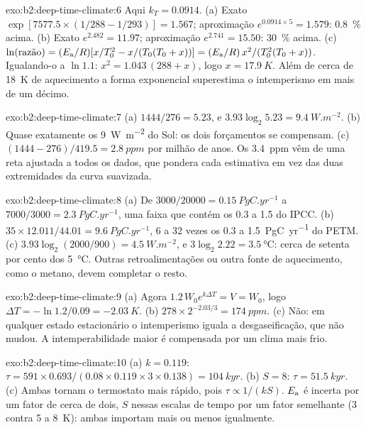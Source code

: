 \begin{solution}{exo:b2:deep-time-climate:6}
Aqui $k_T = 0.0914$. (a) Exato $\exp[7577.5\times(1/288 - 1/293)] = 1.567$; aproximação
$e^{0.0914\times5} = 1.579$: \qty{0.8}{\percent} acima. (b) Exato $e^{2.482} = 11.97$;
aproximação $e^{2.741} = 15.50$: \qty{30}{\percent} acima. (c) $\ln(\text{razão}) = (E_{\text
a}/R)[x/T_0^2 - x/(T_0(T_0 + x))] = (E_{\text a}/R)\,x^2/(T_0^2(T_0 + x))$. Igualando-o a $\ln1.1$:
$x^2 = 1.043\,(288 + x)$, logo $x = \qty{17.9}{K}$. Além de cerca de \qty{18}{K} de aquecimento a
forma exponencial superestima o intemperismo em mais de um décimo.
\end{solution}

\begin{solution}{exo:b2:deep-time-climate:7}
(a) $1444/276 = 5.23$, e $3.93\log_2 5.23 = \qty{9.4}{W.m^{-2}}$. (b) Quase exatamente os
\qty{9}{W.m^{-2}} do Sol: os dois forçamentos se compensam. (c) $(1444 - 276)/419.5 =
\qty{2.8}{ppm}$ por milhão de anos. Os \qty{3.4}{ppm} vêm de uma reta ajustada a todos os
dados, que pondera cada estimativa em vez das duas extremidades da curva suavizada.
\end{solution}

\begin{solution}{exo:b2:deep-time-climate:8}
(a) De $3000/20000 = \qty{0.15}{PgC.yr^{-1}}$ a $7000/3000 = \qty{2.3}{PgC.yr^{-1}}$, uma faixa
que contém os 0.3 a 1.5 do IPCC. (b) $35\times12.011/44.01 = \qty{9.6}{PgC.yr^{-1}}$, 6 a
32 vezes os 0.3 a \qty{1.5}{PgC.yr^{-1}} do PETM. (c) $3.93\log_2(2000/900) = \qty{4.5}{W.m^{-2}}$,
e $3\log_2 2.22 = \qty{3.5}{\celsius}$: cerca de setenta por cento dos \qty{5}{\celsius}. Outras
retroalimentações ou outra fonte de aquecimento, como o metano, devem completar o resto.
\end{solution}

\begin{solution}{exo:b2:deep-time-climate:9}
(a) Agora $1.2\,W_0e^{k\Delta T} = V = W_0$, logo $\Delta T = -\ln 1.2/0.09 = \qty{-2.03}{K}$.
(b) $278\times2^{-2.03/3} = \qty{174}{ppm}$. (c) Não: em qualquer estado estacionário o intemperismo iguala a
desgaseificação, que não mudou. A intemperabilidade maior é compensada por um clima mais frio.
\end{solution}

\begin{solution}{exo:b2:deep-time-climate:10}
(a) $k = 0.119$: $\tau = 591\times0.693/(0.08\times0.119\times3\times0.138) = \qty{104}{kyr}$.
(b) $S = 8$: $\tau = \qty{51.5}{kyr}$. (c) Ambas tornam o termostato mais rápido, pois $\tau \propto
1/(kS)$. $E_{\text a}$ é incerta por um fator de cerca de dois, $S$ nessas escalas de tempo por um
fator semelhante (3 contra 5 a \qty{8}{K}): ambas importam mais ou menos igualmente.
\end{solution}

